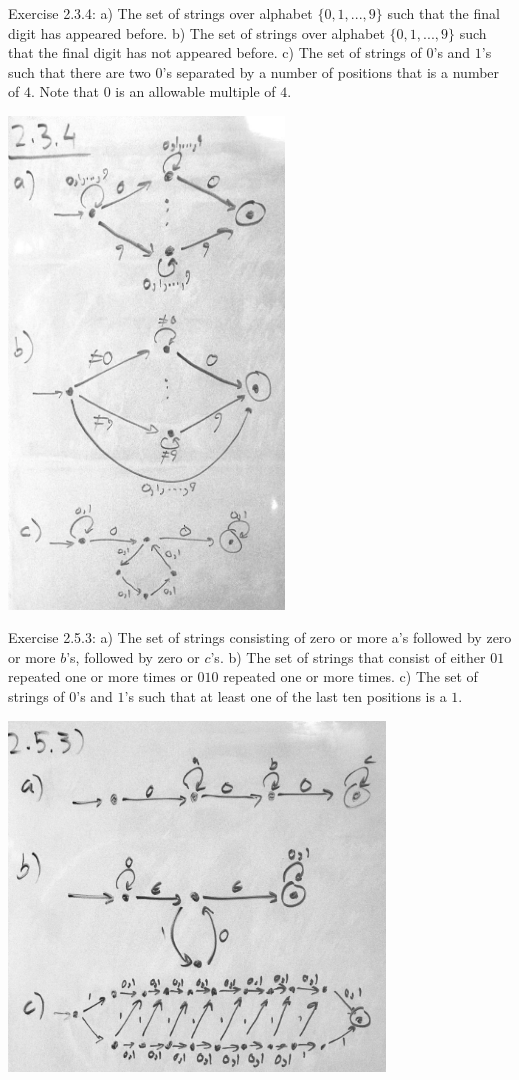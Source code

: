 \documentclass{article}
\theoremstyle{theorem}
\theoremstyle{definition}
\theoremstyle{remark}
\begin{document}
\noindent
Exercise 2.3.4: a) The set of strings over alphabet $\{0,1,..., 9\}$ such that the final digit has appeared before. b) The set of strings over alphabet $\{0,1,...,9\}$ such that the final digit has not appeared before. c) The set of strings of $0$'s and $1$'s such that there are two $0$'s separated by a number of positions that is a number of $4$. Note that $0$ is an allowable multiple of $4$.

\includegraphics[width=0.55\textwidth]{Images/2.3.4.png}

\medskip\noindent
Exercise 2.5.3: a) The set of strings consisting of zero or more a's followed by zero or more $b$'s, followed by zero or $c$'s. b) The set of strings that consist of either $01$ repeated one or more times or $010$ repeated one or more times. c) The set of strings of $0$'s and $1$'s such that at least one of the last ten positions is a $1$.

\includegraphics[width=0.75\textwidth]{Images/2.5.3.png}
\end{document}
